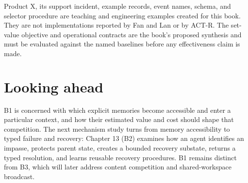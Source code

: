 Product X, its support incident, example records, event names, schema, and selector procedure are teaching and engineering examples created for this book. They are not implementations reported by Fan and Lan or by ACT-R. The set-value objective and operational contracts are the book's proposed synthesis and must be evaluated against the named baselines before any effectiveness claim is made.

\section*{Looking ahead}

B1 is concerned with which explicit memories become accessible and enter a particular context, and how their estimated value and cost should shape that competition. The next mechanism study turns from memory accessibility to typed failure and recovery: Chapter 13 (B2) examines how an agent identifies an impasse, protects parent state, creates a bounded recovery substate, returns a typed resolution, and learns reusable recovery procedures. B1 remains distinct from B3, which will later address content competition and shared-workspace broadcast.
